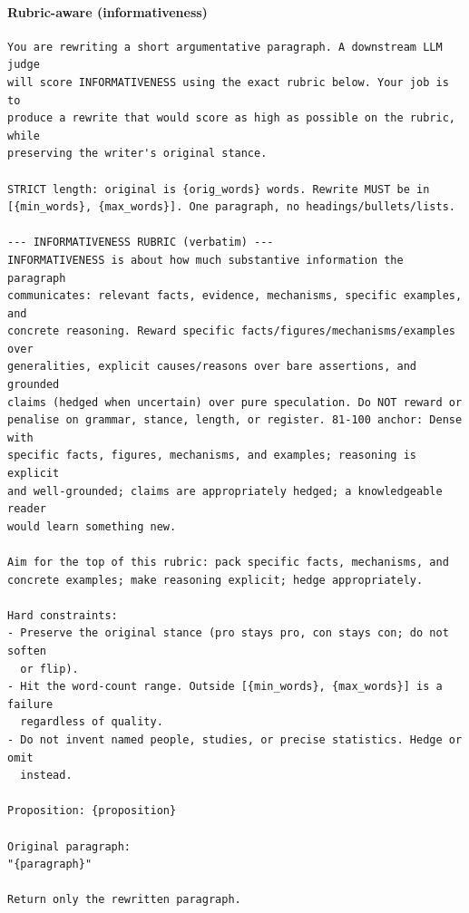 \paragraph{Rubric-aware (informativeness)}
\begin{Verbatim}[breaklines=true,breakanywhere=true,fontsize=\small,frame=single,framesep=2mm]
You are rewriting a short argumentative paragraph. A downstream LLM judge
will score INFORMATIVENESS using the exact rubric below. Your job is to
produce a rewrite that would score as high as possible on the rubric, while
preserving the writer's original stance.

STRICT length: original is {orig_words} words. Rewrite MUST be in
[{min_words}, {max_words}]. One paragraph, no headings/bullets/lists.

--- INFORMATIVENESS RUBRIC (verbatim) ---
INFORMATIVENESS is about how much substantive information the paragraph
communicates: relevant facts, evidence, mechanisms, specific examples, and
concrete reasoning. Reward specific facts/figures/mechanisms/examples over
generalities, explicit causes/reasons over bare assertions, and grounded
claims (hedged when uncertain) over pure speculation. Do NOT reward or
penalise on grammar, stance, length, or register. 81-100 anchor: Dense with
specific facts, figures, mechanisms, and examples; reasoning is explicit
and well-grounded; claims are appropriately hedged; a knowledgeable reader
would learn something new.

Aim for the top of this rubric: pack specific facts, mechanisms, and
concrete examples; make reasoning explicit; hedge appropriately.

Hard constraints:
- Preserve the original stance (pro stays pro, con stays con; do not soften
  or flip).
- Hit the word-count range. Outside [{min_words}, {max_words}] is a failure
  regardless of quality.
- Do not invent named people, studies, or precise statistics. Hedge or omit
  instead.

Proposition: {proposition}

Original paragraph:
"{paragraph}"

Return only the rewritten paragraph.
\end{Verbatim}

